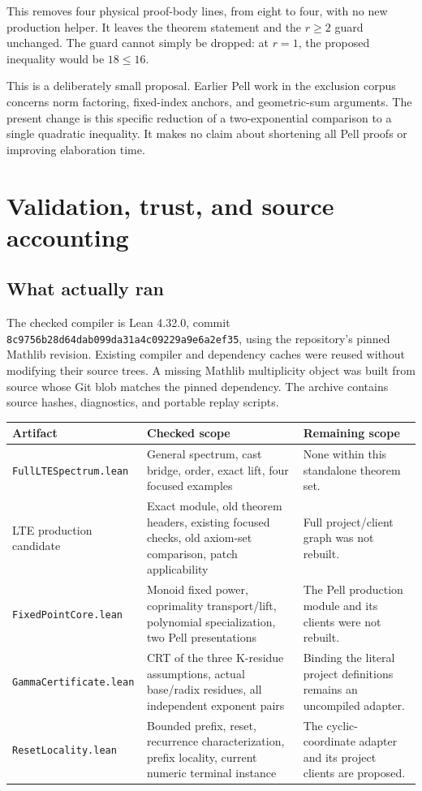 \documentclass[11pt]{article}
\newcommand{\code}[1]{\nolinkurl{#1}}
\begin{document}
This removes four physical proof-body lines, from eight to four, with no new
production helper. It leaves the theorem statement and the \(r\ge2\) guard
unchanged. The guard cannot simply be dropped: at \(r=1\), the proposed
inequality would be \(18\le16\).

This is a deliberately small proposal. Earlier Pell work in the exclusion
corpus concerns norm factoring, fixed-index anchors, and geometric-sum
arguments. The present change is this specific reduction of a two-exponential
comparison to a single quadratic inequality. It makes no claim about shortening
all Pell proofs or improving elaboration time.

\section{Validation, trust, and source accounting}
\subsection{What actually ran}
The checked compiler is Lean 4.32.0, commit
\code{8c9756b28d64dab099da31a4c09229a9e6a2ef35}, using the repository's pinned
Mathlib revision. Existing compiler and dependency caches were reused without
modifying their source trees. A missing Mathlib multiplicity object was built
from source whose Git blob matches the pinned dependency. The archive contains
source hashes, diagnostics, and portable replay scripts.

\begin{longtable}{@{}>{\raggedright\arraybackslash}p{3.5cm}>{\raggedright\arraybackslash}p{4.5cm}>{\raggedright\arraybackslash}p{6.1cm}@{}}
\toprule
Artifact & Checked scope & Remaining scope\\
\midrule
\endhead
\code{FullLTESpectrum.lean} & General spectrum, cast bridge, order, exact lift, four focused examples & None within this standalone theorem set.\\[5pt]
LTE production candidate & Exact module, old theorem headers, existing focused checks, old axiom-set comparison, patch applicability & Full project/client graph was not rebuilt.\\[5pt]
\code{FixedPointCore.lean} & Monoid fixed power, coprimality transport/lift, polynomial specialization, two Pell presentations & The Pell production module and its clients were not rebuilt.\\[5pt]
\code{GammaCertificate.lean} & CRT of the three K-residue assumptions, actual base/radix residues, all independent exponent pairs & Binding the literal project definitions remains an uncompiled adapter.\\[5pt]
\code{ResetLocality.lean} & Bounded prefix, reset, recurrence characterization, prefix locality, current numeric terminal instance & The cyclic-coordinate adapter and its project clients are proposed.\\
\bottomrule
\end{longtable}
\end{document}
